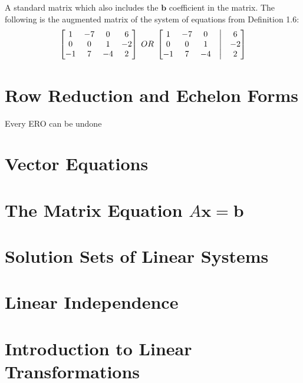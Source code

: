 \documentclass{report}
\begin{document}
\begin{definition}
A standard matrix which also includes the $\mathbf{b}$ coefficient in the matrix. The following is the augmented matrix of the system of equations from Definition 1.6:
\begin{equation*}
\begin{bmatrix}
1 & -7 & 0 & 6 \\ 
0 & 0 & 1 & -2 \\ 
-1 & 7 & -4 & 2
\end{bmatrix}
\;OR\;
\begin{bmatrix}
1 & -7 & 0 &\bigm| & 6 \\ 
0 & 0 & 1 &\bigm| & -2 \\ 
-1 & 7 & -4 &\bigm| & 2
\end{bmatrix}
\end{equation*}
\end{definition}

\section{Row Reduction and Echelon Forms}

Every ERO can be undone

\section{Vector Equations}

\section{The Matrix Equation $A\mathbf{x}=\mathbf{b}$}

\section{Solution Sets of Linear Systems}

\section{Linear Independence}

\section{Introduction to Linear Transformations}
\end{document}
